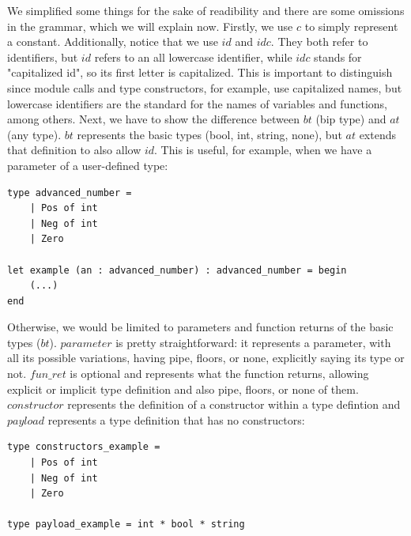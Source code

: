 We simplified some things for the sake of readibility and there are some omissions in the grammar, which we will explain now.
Firstly, we use $c$ to simply represent a constant.
Additionally, notice that we use $id$ and $idc$.
They both refer to identifiers, but $id$ refers to an all lowercase identifier, while $idc$ stands for "capitalized id", so its first letter is capitalized.
This is important to distinguish since module calls and type constructors, for example, use capitalized names, but lowercase identifiers are the standard for the names of variables and functions, among others.
Next, we have to show the difference between $bt$ (bip type) and $at$ (any type).
$bt$ represents the basic types (bool, int, string, none), but $at$ extends that definition to also allow $id$.
This is useful, for example, when we have a parameter of a user-defined type:

\begin{lstlisting}[mathescape, basicstyle=\ttfamily, columns=flexible,
                    emph={type, and, let, rec, if, then, else, mod, in, for, while, do, done, to, begin, end, assert, match, with, of, open, include,ref},
                    emphstyle=\ttfamily\bfseries\color{myorange}]
type advanced_number = 
	| Pos of int
	| Neg of int
	| Zero

let example (an : advanced_number) : advanced_number = begin
	(...)
end
\end{lstlisting}

Otherwise, we would be limited to parameters and function returns of the basic types ($bt$).
$parameter$ is pretty straightforward: it represents a parameter, with all its possible variations, having pipe, floors, or none, explicitly saying its type or not.
$fun\_ret$ is optional and represents what the function returns, allowing explicit or implicit type definition and also pipe, floors, or none of them.
$constructor$ represents the definition of a constructor within a type defintion and $payload$ represents a type definition that has no constructors:

\begin{lstlisting}[mathescape, basicstyle=\ttfamily, columns=flexible,
                    emph={type, and, let, rec, if, then, else, mod, in, for, while, do, done, to, begin, end, assert, match, with, of, open, include,ref},
                    emphstyle=\ttfamily\bfseries\color{myorange}]
type constructors_example = 
	| Pos of int
	| Neg of int
	| Zero

type payload_example = int * bool * string
\end{lstlisting}

